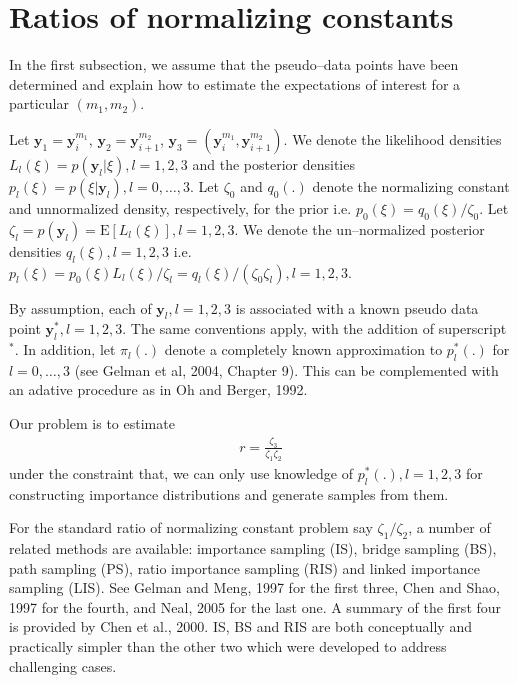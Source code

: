 \section{Ratios of normalizing constants}
In the first subsection, we assume that the pseudo--data points have been determined and explain how to estimate the expectations of interest for a particular $(m_1,m_2)$. 

Let $\mathbf{y}_1=\mathbf{y}_{i}^{m_1}$, $\mathbf{y}_2=\mathbf{y}_{i+1}^{m_2}$, $\mathbf{y}_3=(\mathbf{y}_{i}^{m_1},\mathbf{y}_{i+1}^{m_2})$. We denote the likelihood densities $L_{l}(\xi)=p(\mathbf{y}_l|\xi),l=1,2,3$ and the posterior densities $p_l(\xi)=p(\xi|\mathbf{y}_l),l=0,\ldots,3$. Let $\zeta_0$ and $q_0(.)$ denote the normalizing constant and unnormalized density, respectively, for the prior i.e. $p_0(\xi)=q_0(\xi)/\zeta_0$. Let $\zeta_l=p(\mathbf{y}_l)=\mathrm{E}[L_l(\xi)],l=1,2,3$. We denote the un--normalized posterior densities $q_l(\xi),l=1,2,3$ i.e. $p_l(\xi)=p_0(\xi)L_l(\xi)/\zeta_l=q_l(\xi)/(\zeta_0\zeta_l),l=1,2,3$.

By assumption, each of $\mathbf{y}_l,l=1,2,3$ is associated with a known pseudo data point $\mathbf{y}_l^*,l=1,2,3$. The same conventions apply, with the addition of superscript $^*$. In addition, let $\pi_{l}(.)$ denote a completely known approximation to $p_l^*(.)$ for $l=0,\ldots,3$ (see Gelman et al, 2004, Chapter 9). This can be complemented with an adative procedure as in Oh and Berger, 1992. 

Our problem is to estimate
\begin{align}
r=\frac{\zeta_{3}}{\zeta_{1} \zeta_{2}}
\end{align}under the constraint that, we can only use knowledge of $p_l^*(.),l=1,2,3$ for constructing importance distributions and generate samples from them. 

For the standard ratio of normalizing constant problem say $\zeta_1/\zeta_2$, a number of related methods are available: importance sampling (IS), bridge sampling (BS), path sampling (PS), ratio importance sampling (RIS) and linked importance sampling (LIS). See Gelman and Meng, 1997 for the first three, Chen and Shao, 1997 for the fourth, and Neal, 2005 for the last one. A summary of the first four is provided by Chen et al., 2000. IS, BS and RIS are both conceptually and practically simpler than the other two which were developed to address challenging cases. 

